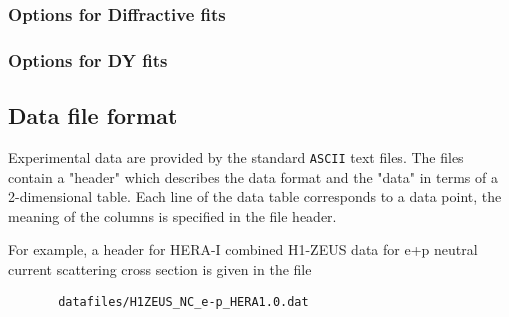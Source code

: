 \documentclass[11pt,a4paper]{article}
\begin{document}
\subsubsection{Options for Diffractive fits}
\subsubsection{Options for DY fits}
\subsection{Data file format}
\label{sec:dataformat}
   Experimental data are provided by the standard {\tt ASCII} text files. The files
   contain a "header" which describes the data format and the "data" in terms
   of a 2-dimensional table. Each line of the data table corresponds to a
   data point, the meaning of the columns is specified in the file header.

   For example, a header for HERA-I combined H1-ZEUS data for e+p neutral 
   current scattering cross section is given in the file

\begin{verbatim}
       datafiles/H1ZEUS_NC_e-p_HERA1.0.dat
\end{verbatim}
\end{document}
